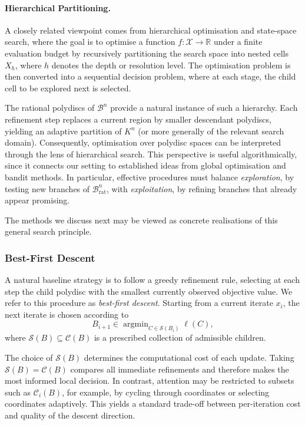 \documentclass[10pt]{article}
\theoremstyle{definition}
\DeclareMathOperator*{\argmin}{\text{argmin}}
\begin{document}
\paragraph{Hierarchical Partitioning.}
A closely related viewpoint comes from hierarchical optimisation and state-space search, where the goal is to optimise a function $f\colon \mathcal X \to \mathbb R$ under a finite evaluation budget by recursively partitioning the search space into nested cells $X_h$, where $h$ denotes the depth or resolution level. The optimisation problem is then converted into a sequential decision problem, where at each stage, the child cell to be explored next is selected. 

The rational polydiscs of $\mathcal B^n$ provide a natural instance of such a hierarchy. Each refinement step replaces a current region by smaller descendant polydiscs, yielding an adaptive partition of $K^n$ (or more generally of the relevant search domain). Consequently, optimisation over polydisc spaces can be interpreted through the lens of hierarchical search. This perspective is useful algorithmically, since it connects our setting to established ideas from global optimisation and bandit methods. In particular, effective procedures must balance \emph{exploration}, by testing new branches of $\mathcal B^n_{\mathrm{rat}}$, with \emph{exploitation}, by refining branches that already appear promising.

The methods we discuss next may be viewed as concrete realisations of this general search principle.

\subsubsection{Best-First Descent} \label{subsec:best-first-search}

A natural baseline strategy is to follow a greedy refinement rule, selecting at each step the child polydisc with the smallest currently observed objective value. We refer to this procedure as \emph{best-first descent}. Starting from a current iterate \(x_i\), the next iterate is chosen according to
$$
B_{i+1}\in \argmin_{C\in \mathcal S(B_i)} \ell(C),
$$
where $\mathcal S(B)\subseteq \mathcal C(B)$ is a prescribed collection of admissible children.

The choice of $\mathcal{S}(B)$ determines the computational cost of each update. Taking $\mathcal{S}(B) = \mathcal{C}(B)$ compares all immediate refinements and therefore makes the most informed local decision. In contrast, attention may be restricted to subsets such as $\mathcal{C}_i(B)$, for example, by cycling through coordinates or selecting coordinates adaptively. This yields a standard trade-off between per-iteration cost and quality of the descent direction.
\end{document}
